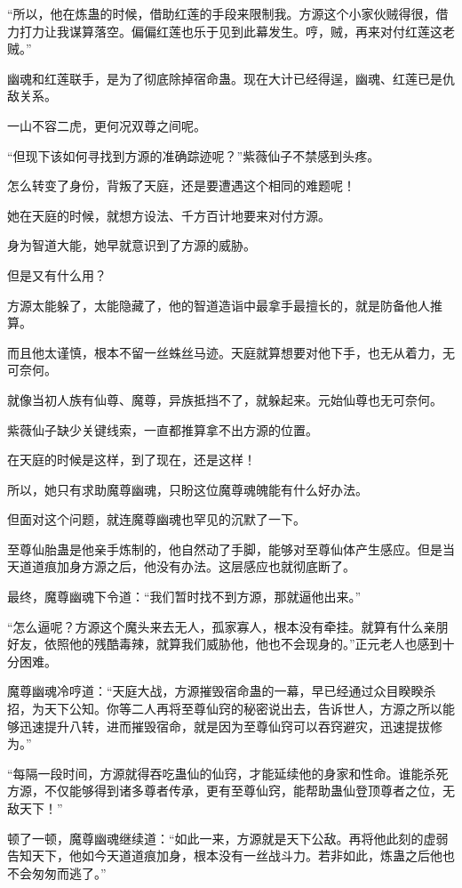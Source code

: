 \begin{this_body}
“所以，他在炼蛊的时候，借助红莲的手段来限制我。方源这个小家伙贼得很，借力打力让我谋算落空。偏偏红莲也乐于见到此幕发生。哼，贼，再来对付红莲这老贼。”

幽魂和红莲联手，是为了彻底除掉宿命蛊。现在大计已经得逞，幽魂、红莲已是仇敌关系。

一山不容二虎，更何况双尊之间呢。

“但现下该如何寻找到方源的准确踪迹呢？”紫薇仙子不禁感到头疼。

怎么转变了身份，背叛了天庭，还是要遭遇这个相同的难题呢！

她在天庭的时候，就想方设法、千方百计地要来对付方源。

身为智道大能，她早就意识到了方源的威胁。

但是又有什么用？

方源太能躲了，太能隐藏了，他的智道造诣中最拿手最擅长的，就是防备他人推算。

而且他太谨慎，根本不留一丝蛛丝马迹。天庭就算想要对他下手，也无从着力，无可奈何。

就像当初人族有仙尊、魔尊，异族抵挡不了，就躲起来。元始仙尊也无可奈何。

紫薇仙子缺少关键线索，一直都推算拿不出方源的位置。

在天庭的时候是这样，到了现在，还是这样！

所以，她只有求助魔尊幽魂，只盼这位魔尊魂魄能有什么好办法。

但面对这个问题，就连魔尊幽魂也罕见的沉默了一下。

至尊仙胎蛊是他亲手炼制的，他自然动了手脚，能够对至尊仙体产生感应。但是当天道道痕加身方源之后，他没有办法。这层感应也就彻底断了。

最终，魔尊幽魂下令道：“我们暂时找不到方源，那就逼他出来。”

“怎么逼呢？方源这个魔头来去无人，孤家寡人，根本没有牵挂。就算有什么亲朋好友，依照他的残酷毒辣，就算我们威胁他，他也不会现身的。”正元老人也感到十分困难。

魔尊幽魂冷哼道：“天庭大战，方源摧毁宿命蛊的一幕，早已经通过众目睽睽杀招，为天下公知。你等二人再将至尊仙窍的秘密说出去，告诉世人，方源之所以能够迅速提升八转，进而摧毁宿命，就是因为至尊仙窍可以吞窍避灾，迅速提拔修为。”

“每隔一段时间，方源就得吞吃蛊仙的仙窍，才能延续他的身家和性命。谁能杀死方源，不仅能够得到诸多尊者传承，更有至尊仙窍，能帮助蛊仙登顶尊者之位，无敌天下！”

顿了一顿，魔尊幽魂继续道：“如此一来，方源就是天下公敌。再将他此刻的虚弱告知天下，他如今天道道痕加身，根本没有一丝战斗力。若非如此，炼蛊之后他也不会匆匆而逃了。”


\end{this_body}

